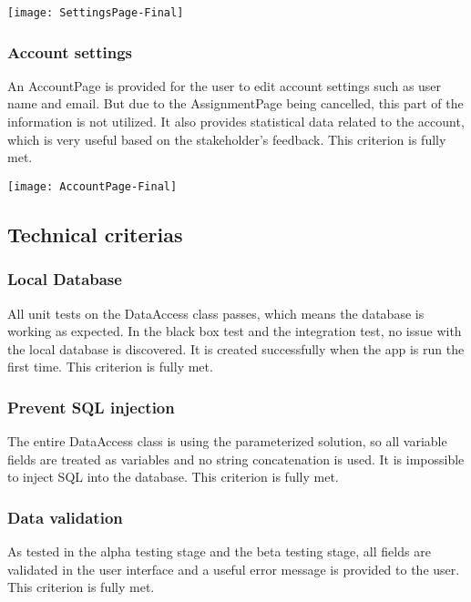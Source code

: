 \documentclass[report.tex]{subfiles}
\begin{document}
\texttt{[image: SettingsPage-Final]}

\subsubsection{Account settings}

An AccountPage is provided for the user to edit account settings such as user name and email. But due to the AssignmentPage being cancelled, this part of the information is not utilized. It also provides statistical data related to the account, which is very useful based on the stakeholder's feedback. This criterion is fully met.

\texttt{[image: AccountPage-Final]}

\subsection{Technical criterias}

\subsubsection{Local Database}

All unit tests on the DataAccess class passes, which means the database is working as expected. In the black box test and the integration test, no issue with the local database is discovered. It is created successfully when the app is run the first time. This criterion is fully met.

\subsubsection{Prevent SQL injection}

The entire DataAccess class is using the parameterized solution, so all variable fields are treated as variables and no string concatenation is used. It is impossible to inject SQL into the database. This criterion is fully met.

\subsubsection{Data validation}

As tested in the alpha testing stage and the beta testing stage, all fields are validated in the user interface and a useful error message is provided to the user. This criterion is fully met.
\end{document}
